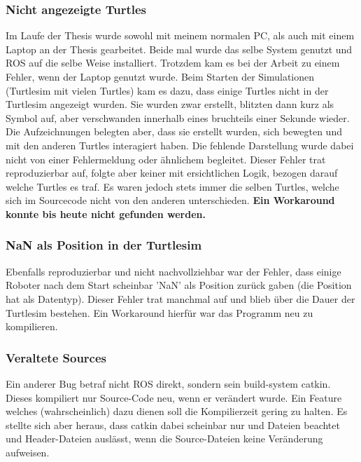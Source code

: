 \subsubsection*{Nicht angezeigte Turtles}
Im Laufe der Thesis wurde sowohl mit meinem normalen PC, als auch mit einem Laptop an der Thesis gearbeitet. Beide mal wurde das selbe System genutzt und ROS auf die selbe Weise installiert. Trotzdem kam es bei der Arbeit zu einem Fehler, wenn der Laptop genutzt wurde. Beim Starten der Simulationen (Turtlesim mit vielen Turtles) kam es dazu, dass einige Turtles nicht in der Turtlesim angezeigt wurden. Sie wurden zwar erstellt, blitzten dann kurz als Symbol auf, aber verschwanden innerhalb eines bruchteils einer Sekunde wieder. Die Aufzeichnungen belegten aber, dass sie erstellt wurden, sich bewegten und mit den anderen Turtles interagiert haben. Die fehlende Darstellung wurde dabei nicht von einer Fehlermeldung oder ähnlichem begleitet. Dieser Fehler trat reproduzierbar auf, folgte aber keiner mit ersichtlichen Logik, bezogen darauf welche Turtles es traf. Es waren jedoch stets immer die selben Turtles, welche sich im Sourcecode nicht von den anderen unterschieden. \textbf{Ein Workaround konnte bis heute nicht gefunden werden.}

\subsubsection*{NaN als Position in der Turtlesim}
Ebenfalls reproduzierbar und nicht nachvollziehbar war der Fehler, dass einige Roboter nach dem Start scheinbar 'NaN' als Position zurück gaben (die Position hat  als Datentyp). Dieser Fehler trat manchmal auf und blieb über die Dauer der Turtlesim bestehen. Ein Workaround hierfür war das Programm neu zu kompilieren.

\subsubsection*{Veraltete Sources}
Ein anderer Bug betraf nicht ROS direkt, sondern sein build-system catkin. Dieses kompiliert nur Source-Code neu, wenn er verändert wurde. Ein Feature welches (wahrscheinlich) dazu dienen soll die Kompilierzeit gering zu halten. Es stellte sich aber heraus, dass catkin dabei scheinbar nur  und  Dateien beachtet und Header-Dateien auslässt, wenn die Source-Dateien keine Veränderung aufweisen.

